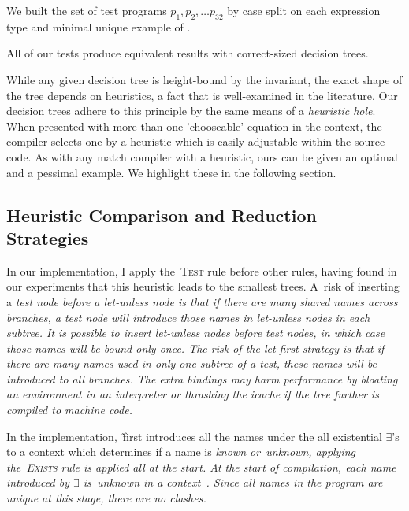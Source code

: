 \documentclass[runningheads]{llncs}
\begin{document}
We built the set of test programs $p_1, p_2, \dots p_{32}$ by case split on each
expression type and minimal unique example of \iffibf. 

All of our tests produce equivalent results with correct-sized decision trees. 

While any given decision tree is height-bound by the invariant, the exact shape
of the tree depends on heuristics, a fact that is well-examined in the
literature\cite{macqueen1985tree,maranget,scottramsey}. %
 Our decision trees adhere to this principle by the same means of a
\textit{heuristic hole}. %
When presented with more than one 'chooseable' equation in the context, the
compiler selects one by a heuristic which is easily adjustable within the source
code. %
As with any match compiler with a heuristic, ours can be given an optimal and a
pessimal example. We highlight these in the following section. %

\subsection{Heuristic Comparison and Reduction Strategies}
\label{reductionstrats}

      In our implementation, I apply the~\textsc{Test} rule before other rules,
      having found in our experiments that this heuristic leads to the smallest trees. %
      A~risk of inserting a \it{test} node before a \it{let-unless} node is that
      if there are many shared names across branches, a \it{test} node will
      introduce those names in \it{let-unless} nodes in each subtree. %
      It is possible to insert \it{let-unless} nodes before \it{test}
      nodes, in which case those names will be bound
      only once. %
      The risk of the \it{let}-first strategy
      is that if there are many names used in only one subtree of a \it{test},
      these names will be introduced to \it{all} branches. %
      The extra bindings may harm performance by bloating an environment in an
      interpreter or thrashing the icache if the tree further is compiled to
      machine code. %

    In the implementation,~\DTran\~first introduces all the names under the
    all existential $\exists$'s to a context which determines if a name is
    \it{known} or~\it{unknown}, applying the~\textsc{Exists} rule is applied
    all at the start. %
    At the start of compilation, each name introduced by $\exists$ is~\it{unknown}
    in a context~\ctx. %
    Since all names in the program are unique at this stage, there are no clashes. %
\end{document}
